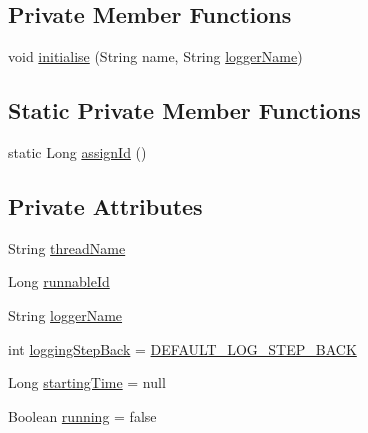 \subsection*{Private Member Functions}
\begin{DoxyCompactItemize}
\item 
void \hyperlink{classit_1_1emarolab_1_1cagg_1_1core_1_1evaluation_1_1CaggThread_a11997c9958a02cca8f0d65e1f5ee1992}{initialise} (String name, String \hyperlink{classit_1_1emarolab_1_1cagg_1_1core_1_1evaluation_1_1CaggThread_ae7dd4d1aec246c90d4a997b825978256}{logger\-Name})
\end{DoxyCompactItemize}
\subsection*{Static Private Member Functions}
\begin{DoxyCompactItemize}
\item 
static Long \hyperlink{classit_1_1emarolab_1_1cagg_1_1core_1_1evaluation_1_1CaggThread_a782cf7036e5334f67cdc1ff3f5a751d5}{assign\-Id} ()
\end{DoxyCompactItemize}
\subsection*{Private Attributes}
\begin{DoxyCompactItemize}
\item 
String \hyperlink{classit_1_1emarolab_1_1cagg_1_1core_1_1evaluation_1_1CaggThread_a9f93a5dd960d289f5e2a1889f8b6f55b}{thread\-Name}
\item 
Long \hyperlink{classit_1_1emarolab_1_1cagg_1_1core_1_1evaluation_1_1CaggThread_a47118bd7dad8aedaf8b1d5d4b296b5d2}{runnable\-Id}
\item 
String \hyperlink{classit_1_1emarolab_1_1cagg_1_1core_1_1evaluation_1_1CaggThread_ae7dd4d1aec246c90d4a997b825978256}{logger\-Name}
\item 
int \hyperlink{classit_1_1emarolab_1_1cagg_1_1core_1_1evaluation_1_1CaggThread_a1cee6eb33e519f65885ddb3a5ab6515f}{logging\-Step\-Back} = \hyperlink{classit_1_1emarolab_1_1cagg_1_1core_1_1evaluation_1_1CaggThread_ae39d3ab7707645e1eb216559555419f2}{D\-E\-F\-A\-U\-L\-T\-\_\-\-L\-O\-G\-\_\-\-S\-T\-E\-P\-\_\-\-B\-A\-C\-K}
\item 
Long \hyperlink{classit_1_1emarolab_1_1cagg_1_1core_1_1evaluation_1_1CaggThread_af4ad33647a3b9e329340c246585fdc83}{starting\-Time} = null
\item 
Boolean \hyperlink{classit_1_1emarolab_1_1cagg_1_1core_1_1evaluation_1_1CaggThread_a8ebf5695b4282a63f70c666f6f9159cb}{running} = false
\end{DoxyCompactItemize}


